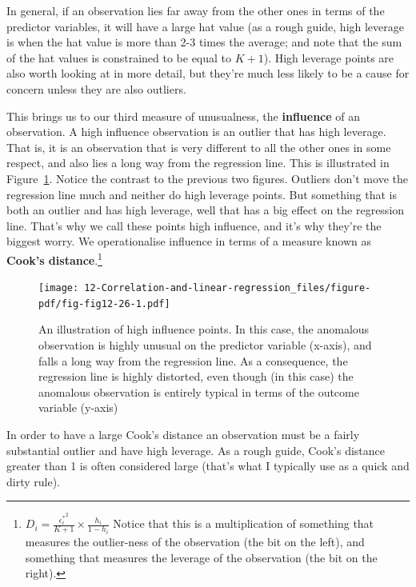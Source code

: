 \documentclass[
  a4paper,
]{book}
\begin{document}
In general, if an observation lies far away from the other ones in terms
of the predictor variables, it will have a large hat value (as a rough
guide, high leverage is when the hat value is more than 2-3 times the
average; and note that the sum of the hat values is constrained to be
equal to \(K + 1\)). High leverage points are also worth looking at in
more detail, but they're much less likely to be a cause for concern
unless they are also outliers.

This brings us to our third measure of unusualness, the
\textbf{influence} of an observation. A high influence observation is an
outlier that has high leverage. That is, it is an observation that is
very different to all the other ones in some respect, and also lies a
long way from the regression line. This is illustrated in
Figure~\ref{fig-fig12-26}. Notice the contrast to the previous two
figures. Outliers don't move the regression line much and neither do
high leverage points. But something that is both an outlier and has high
leverage, well that has a big effect on the regression line. That's why
we call these points high influence, and it's why they're the biggest
worry. We operationalise influence in terms of a measure known as
\textbf{Cook's distance}.\footnote{\(D_i=\frac{{\epsilon_i^*}^2}{K+1} \times \frac{h_i}{1-h_i}\)
  Notice that this is a multiplication of something that measures the
  outlier-ness of the observation (the bit on the left), and something
  that measures the leverage of the observation (the bit on the right).}

\begin{figure}

\texttt{[image: 12-Correlation-and-linear-regression\_files/figure-pdf/fig-fig12-26-1.pdf]} \hfill{}

\caption{\label{fig-fig12-26}An illustration of high influence points.
In this case, the anomalous observation is highly unusual on the
predictor variable (x-axis), and falls a long way from the regression
line. As a consequence, the regression line is highly distorted, even
though (in this case) the anomalous observation is entirely typical in
terms of the outcome variable (y-axis)}

\end{figure}

In order to have a large Cook's distance an observation must be a fairly
substantial outlier and have high leverage. As a rough guide, Cook's
distance greater than 1 is often considered large (that's what I
typically use as a quick and dirty rule).
\end{document}
